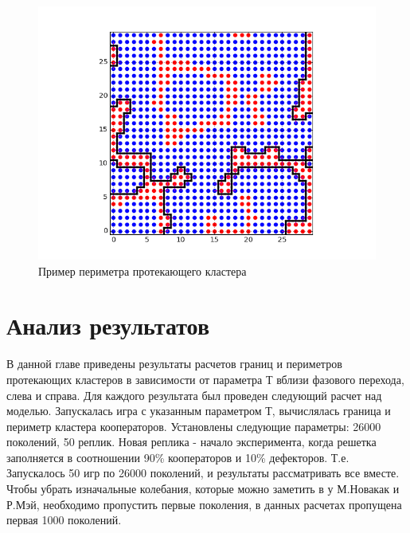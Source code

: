 \documentclass[14pt]{article}
\begin{document}
\begin{figure}[H]
	\includegraphics[center]{border.png}
	\caption{Пример периметра протекающего кластера}
	\label{fig:perim}
\end{figure}

\section{Анализ результатов}
\par В данной главе приведены результаты расчетов границ и периметров протекающих кластеров в зависимости от параметра Т вблизи фазового перехода, слева и справа. Для каждого результата был проведен следующий расчет над моделью. Запускалась игра с указанным параметром Т, вычислялась граница и периметр кластера кооператоров. Установлены следующие параметры: 26000 поколений, 50 реплик. Новая реплика - начало эксперимента, когда решетка заполняется в соотношении 90\% кооператоров и 10\% дефекторов. Т.е. Запускалось 50 игр по 26000 поколений, и результаты рассматривать все вместе. Чтобы убрать изначальные колебания, которые можно заметить в у М.Новакак и Р.Мэй, необходимо пропустить первые поколения, в данных расчетах пропущена первая 1000 поколений.
\\
\end{document}
